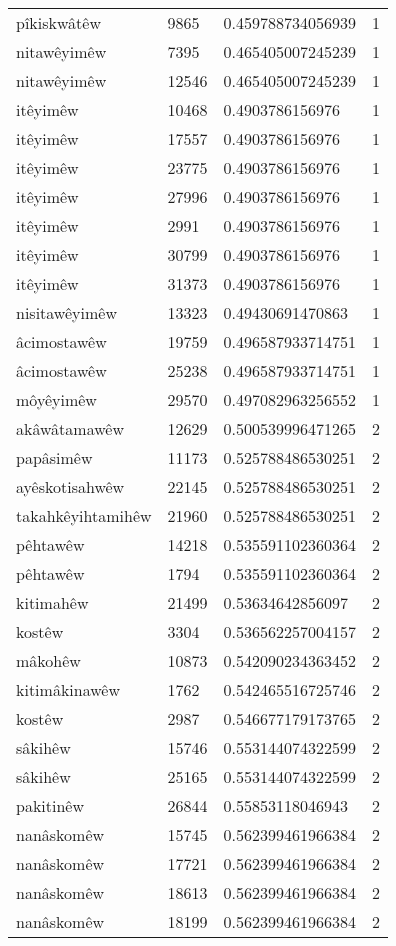 \begin{longtable}{llll}
pîkiskwâtêw & 9865 & 0.459788734056939 & 1\\
nitawêyimêw & 7395 & 0.465405007245239 & 1\\
nitawêyimêw & 12546 & 0.465405007245239 & 1\\
itêyimêw & 10468 & 0.4903786156976 & 1\\
itêyimêw & 17557 & 0.4903786156976 & 1\\
itêyimêw & 23775 & 0.4903786156976 & 1\\
itêyimêw & 27996 & 0.4903786156976 & 1\\
itêyimêw & 2991 & 0.4903786156976 & 1\\
itêyimêw & 30799 & 0.4903786156976 & 1\\
itêyimêw & 31373 & 0.4903786156976 & 1\\
nisitawêyimêw & 13323 & 0.49430691470863 & 1\\
âcimostawêw & 19759 & 0.496587933714751 & 1\\
âcimostawêw & 25238 & 0.496587933714751 & 1\\
môyêyimêw & 29570 & 0.497082963256552 & 1\\
akâwâtamawêw & 12629 & 0.500539996471265 & 2\\
papâsimêw & 11173 & 0.525788486530251 & 2\\
ayêskotisahwêw & 22145 & 0.525788486530251 & 2\\
takahkêyihtamihêw & 21960 & 0.525788486530251 & 2\\
pêhtawêw & 14218 & 0.535591102360364 & 2\\
pêhtawêw & 1794 & 0.535591102360364 & 2\\
kitimahêw & 21499 & 0.53634642856097 & 2\\
kostêw & 3304 & 0.536562257004157 & 2\\
mâkohêw & 10873 & 0.542090234363452 & 2\\
kitimâkinawêw & 1762 & 0.542465516725746 & 2\\
kostêw & 2987 & 0.546677179173765 & 2\\
sâkihêw & 15746 & 0.553144074322599 & 2\\
sâkihêw & 25165 & 0.553144074322599 & 2\\
pakitinêw & 26844 & 0.55853118046943 & 2\\
nanâskomêw & 15745 & 0.562399461966384 & 2\\
nanâskomêw & 17721 & 0.562399461966384 & 2\\
nanâskomêw & 18613 & 0.562399461966384 & 2\\
nanâskomêw & 18199 & 0.562399461966384 & 2\\

\end{longtable}
